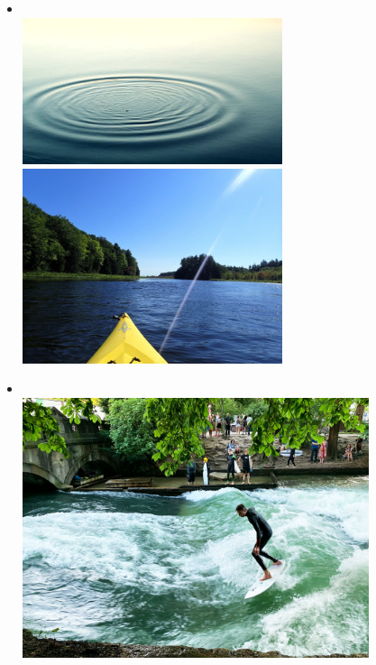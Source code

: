 \begin{frame}
\begin{minipage}{0.45\textwidth}
\begin{itemize}
\item<1->[] 
\centering
\vspace{-1cm}
\\[0.5cm]
\hspace{0.2cm}
\includegraphics[width=0.6\textwidth]{Resources/Images/waves.jpg}
\\[0.5cm]
\hspace{1.8cm}
\includegraphics[width=0.6\textwidth]{Resources/Images/paddle.jpg}
\end{itemize}
\end{minipage}
\begin{minipage}{0.45\textwidth}
\begin{itemize}
\item<2->[]
\centering
{}\\[0.5cm]
\hspace{0.25cm}
\includegraphics[width=0.8\textwidth]{Resources/Images/eisbach.jpg}\\[0.5cm]

\end{itemize}
\end{minipage}
\end{frame}
